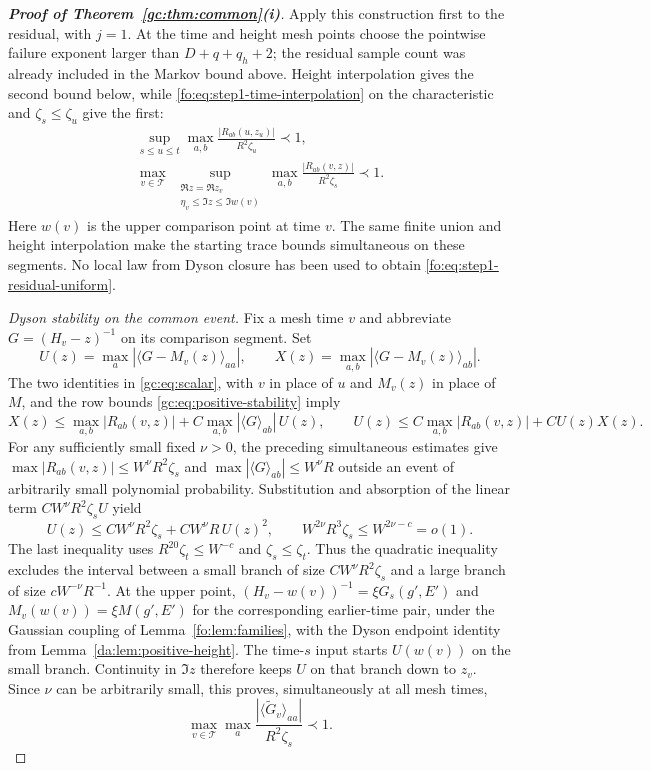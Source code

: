 \documentclass[11pt]{article}
\numberwithin{equation}{section}
\theoremstyle{remark}
\newcommand{\wt}{\widetilde}
\begin{document}
\begin{proof}[\textbf{Proof of Theorem~\ref{gc:thm:common}(i)}]
Apply this construction first to the residual, with $j=1$.
At the time and height mesh points choose the pointwise failure exponent
larger than $D+q+q_h+2$; the residual sample count was already included
in the Markov bound above. Height interpolation gives the second bound
below, while \eqref{fo:eq:step1-time-interpolation} on the characteristic
and $\zeta_s\le\zeta_u$ give the first:
\begin{equation}\label{fo:eq:step1-residual-uniform}
 \begin{gathered}
 \sup_{s\le u\le t}\max_{a,b}
        \frac{|R_{ab}(u,z_u)|}{R^2\zeta_u}\prec1,\\
 \max_{v\in\mathcal T}\ \sup_{\substack{\Re z=\Re z_v\\
                              \eta_v\le\Im z\le\Im w(v)}}
       \max_{a,b}\frac{|R_{ab}(v,z)|}{R^2\zeta_s}\prec1.
 \end{gathered}
\end{equation}
Here $w(v)$ is the upper comparison point at time $v$. The same finite
union and height interpolation make the starting trace bounds
simultaneous on these segments. No local law from Dyson closure has
been used to obtain \eqref{fo:eq:step1-residual-uniform}.

\emph{Dyson stability on the common event.}
Fix a mesh time $v$ and abbreviate $G=(H_v-z)^{-1}$ on its comparison
segment. Set
\[
 U(z)=\max_a|\langle G-M_v(z)\rangle_{aa}|,\qquad
 X(z)=\max_{a,b}|\langle G-M_v(z)\rangle_{ab}|.
\]
The two identities in \eqref{gc:eq:scalar}, with $v$ in place of $u$
and $M_v(z)$ in place of $M$, and the row bounds
\eqref{gc:eq:positive-stability} imply
\[
 X(z)\le\max_{a,b}|R_{ab}(v,z)|
       +C\max_{a,b}|\langle G\rangle_{ab}|\,U(z),\qquad
 U(z)\le C\max_{a,b}|R_{ab}(v,z)|+CU(z)X(z).
\]
For any sufficiently small fixed $\nu>0$, the preceding simultaneous
estimates give $\max|R_{ab}(v,z)|\le W^\nu R^2\zeta_s$ and
$\max|\langle G\rangle_{ab}|\le W^\nu R$ outside an event of arbitrarily
small polynomial probability. Substitution and absorption of the linear
term $CW^\nu R^2\zeta_sU$ yield
\begin{equation}\label{fo:eq:step1-dyson-closure}
 U(z)\le CW^\nu R^2\zeta_s+CW^\nu R\,U(z)^2,\qquad
 W^{2\nu}R^3\zeta_s\le W^{2\nu-c}=o(1).
\end{equation}
The last inequality uses $R^{20}\zeta_t\le W^{-c}$ and
$\zeta_s\le\zeta_t$. Thus the quadratic inequality excludes the interval
between a small branch of size $CW^\nu R^2\zeta_s$ and a large branch
of size $cW^{-\nu}R^{-1}$. At the upper point,
$(H_v-w(v))^{-1}=\xi G_s(g',E')$ and
$M_v(w(v))=\xi M(g',E')$ for the corresponding earlier-time pair,
under the Gaussian coupling of Lemma~\ref{fo:lem:families}, with the
Dyson endpoint identity from Lemma~\ref{da:lem:positive-height}.
The time-$s$ input starts $U(w(v))$ on the small branch. Continuity in
$\Im z$ therefore keeps $U$ on that branch down to $z_v$. Since $\nu$
can be arbitrarily small, this proves, simultaneously at all mesh times,
\[
 \max_{v\in\mathcal T}\max_a
        \frac{|\langle\wt G_v\rangle_{aa}|}{R^2\zeta_s}\prec1.
\]


\end{proof}
\end{document}
